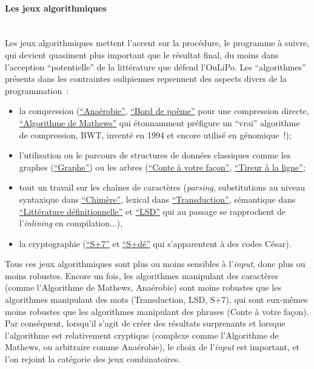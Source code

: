 \documentclass{article}
\newcommand{\subsubsubsection}[1]{\paragraph{#1}\mbox{}\\}
\begin{document}
				\subsubsubsection{Les jeux algorithmiques}
					Les jeux algorithmiques mettent l'accent sur la procédure, le programme à suivre, qui devient quasiment plus important que le résultat final, du moins dans l'acception ``potentielle'' de la littérature que défend l'OuLiPo. Les ``algorithmes'' présents dans les contraintes oulipiennes reprennent des aspects divers de la programmation~:
					\begin{itemize}
						\item la compression (\href{http://oulipo.net/fr/contraintes/anaerobie}{``Anaérobie''}, \href{http://oulipo.net/fr/contraintes/bord-de-poeme}{``Bord de poème''} pour une compression directe, \href{http://oulipo.net/fr/contraintes/algorithme-de-mathews}{``Algorithme de Mathews''} qui étonnamment préfigure un ``vrai'' algorithme de compression, BWT, inventé en 1994 et encore utilisé en génomique~!);
						\item l'utilisation ou le parcours de structures de données classiques comme les graphes (\href{http://oulipo.net/fr/contraintes/graphe}{``Graphe''}) ou les arbres (\href{http://oulipo.net/fr/contraintes/conte-a-votre-facon}{``Conte à votre façon''}, \href{http://oulipo.net/fr/contraintes/tireur-a-la-ligne}{``Tireur à la ligne''};
						\item tout un travail sur les chaînes de caractères (\textit{parsing}, substitutions au niveau syntaxique dans \href{http://oulipo.net/fr/contraintes/chimere}{``Chimère''}, lexical dans \href{http://oulipo.net/fr/contraintes/transduction}{``Transduction''}, sémantique dans \href{http://oulipo.net/fr/contraintes/litterature-definitionnelle}{``Littérature définitionnelle''} et \href{http://oulipo.net/fr/contraintes/lsd}{``LSD''} qui au passage se rapprochent de l'\textit{inlining} en compilation...),
						\item la cryptographie (\href{http://oulipo.net/fr/contraintes/s7}{``S+7''} et \href{http://oulipo.net/fr/contraintes/sde}{``S+dé''} qui s'apparentent à des codes César).
					\end{itemize}
					Tous ces jeux algorithmiques sont plus ou moins sensibles à l'\textit{input}, donc plus ou moins robustes. Encore un fois, les algorithmes manipulant des caractères (comme l'Algorithme de Mathews, Anaérobie) sont moins robustes que les algorithmes manipulant des mots (Transduction, LSD, S+7), qui sont eux-mêmes moins robustes que les algorithmes manipulant des phrases (Conte à votre façon).\\
					Par conséquent, lorsqu'il s'agit de créer des résultats surprenants et lorsque l'algorithme est relativement cryptique (complexe comme l'Algorithme de Mathews, ou arbitraire comme Anaérobie), le choix de l'\textit{input} est important, et l'on rejoint la catégorie des jeux combinatoires.
				
\end{document}
